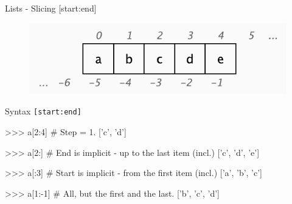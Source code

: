\documentclass[10pt]{beamer}
\begin{document}
\begin{frame}[fragile]{Lists - Slicing [start:end]}

\vspace*{-0.1cm}
\begin{figure}[!h]
\centering
\includegraphics[width=0.55\linewidth]{img/slicing.pdf}
\end{figure}

\vspace*{-0.3cm}

Syntax \small{\texttt{[start:end]}}


\begin{pythoncode}
>>> a[2:4]  # Step = 1.
['c', 'd']
\end{pythoncode}


\begin{pythoncode}
>>> a[2:]  # End is implicit - up to the last item (incl.)
['c', 'd', 'e']
\end{pythoncode}


\begin{pythoncode}
>>> a[:3]  # Start is implicit - from the first item (incl.)
['a', 'b', 'c']
\end{pythoncode}


\begin{pythoncode}
>>> a[1:-1]  # All, but the first and the last.
['b', 'c', 'd']
\end{pythoncode}
\end{frame}
\end{document}

